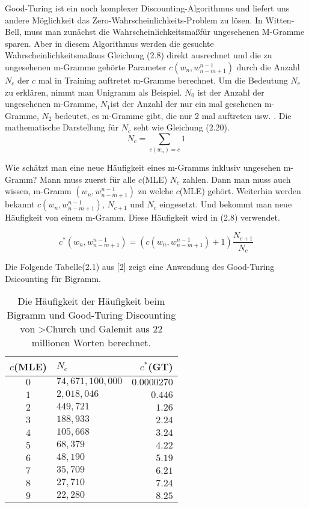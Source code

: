 Good-Turing ist ein noch komplexer Discounting-Algorithmus und liefert uns andere M\"oglichkeit  das Zero-Wahrscheinlichkeits-Problem zu l\"osen. In Witten-Bell, muss man zun\"achst die Wahrscheinlichkeitsma\ss f\"ur ungesehenen M-Gramme sparen. Aber in diesem Algorithmus werden die gesuchte Wahrscheinlichkeitsma\ss aus Gleichung (2.8) direkt ausrechnet und die zu ungesehenen m-Gramme geh\"orte Parameter $c(w_{n},w_{n-m+1}^{n-1})$ durch die Anzahl $N_{c}$ der  $c$ mal in Training auftretet m-Gramme berechnet. Um die Bedeutung $N_{c}$ zu erkl\"aren, nimmt man Unigramm als Beispiel. $N_{0}$ ist der Anzahl der ungesehenen m-Gramme, $N_{1}$ist der Anzahl der nur ein mal gesehenen m-Gramme, $N_{2}$ bedeutet, es   m-Gramme gibt, die nur 2 mal auftreten usw. . Die mathematische Darstellung f\"ur $N_{c}$ seht wie Gleichung (2.20).
\begin{equation}
N_{c}=\sum_{c(w_{n})=c}1
\end{equation}

Wie sch\"atzt man eine neue H\"aufigkeit eines m-Gramms inklusiv ungesehen m-Gramm? Mann muss zuerst f\"ur alle $c$(MLE) $N_{c}$ zahlen. Dann man muss auch wissen, m-Gramm $(w_{n},w_{n-m+1}^{n-1})$ zu welche $c$(MLE) geh\"ort. Weiterhin werden bekannt $c(w_{n},w_{n-m+1}^{n-1})$, $N_{c+1}$ und $N_{c}$ eingesetzt. Und bekommt man neue H\"aufigkeit von einem m-Gramm. Diese H\"aufigkeit wird in (2.8) verwendet.

\begin{equation}
c^{*}(w_{n},w_{n-m+1}^{n-1})=(c(w_{n},w_{n-m+1}^{n-1})+1)\frac{N_{c+1}}{N_{c}}
\end{equation}

Die Folgende Tabelle(2.1)  aus [2] zeigt eine Anwendung des Good-Turing Dsicounting f\"ur Bigramm.

\begin{table}[h]
  \begin{center}
    \begin{tabular}{clr}
      \toprule
      \bf $c$(MLE) & \bf $N_{c}$ & \bf $c^{*}$(GT)\\      
      \midrule
      $0$ &  $74,671,100,000$ & $0.0000270$  \\
      $1$ &  $2,018,046$ 			& $0.446$  \\
      $2$ &  $449,721$ 				& $1.26$  \\
      $3$ &  $188,933$ 				& $2.24$  \\
      $4$ &  $105,668$ 				& $3.24$  \\
      $5$ &  $68,379$ 				& $4.22$  \\
      $6$ &  $48,190$ 				& $5.19$  \\
      $7$ &  $35,709$ 				& $6.21$  \\
      $8$ &  $27,710$ 				& $7.24$  \\
      $9$ &  $22,280$ 				& $8.25$  \\
      \bottomrule
    \end{tabular}
  \end{center}
\caption{Die H\"aufigkeit der H\"aufigkeit beim Bigramm und Good-Turing Discounting von >Church und Galemit aus 22 millionen Worten berechnet.}
\label{tab:table_1}
\end{table}

